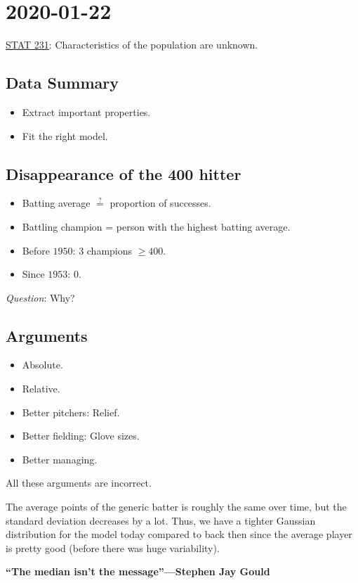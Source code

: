 \section{2020-01-22}
\underline{STAT 231}: Characteristics of the population
are unknown.

\subsection*{Data Summary}
\begin{itemize}
    \item Extract important properties.
    \item Fit the right model.
\end{itemize}

\subsection*{Disappearance of the 400 hitter}
\begin{itemize}
    \item Batting average $ \stackrel{?}{=} $ proportion of successes.
    \item Battling champion = person with the highest batting average.
    \item Before $ 1950 $: 3 champions $ \geqslant 400 $.
    \item Since $ 1953 $: 0.
\end{itemize}
\emph{Question}: Why?

\subsection*{Arguments}
\begin{itemize}
    \item Absolute.
    \item Relative.
    \item Better pitchers: Relief.
    \item Better fielding: Glove sizes.
    \item Better managing.
\end{itemize}
All these arguments are incorrect.

The average points of the generic batter is roughly the same over time,
but the standard deviation decreases by a lot. Thus, we have a tighter Gaussian
distribution for the model today compared to back then since the average
player is pretty good (before there was huge variability).

\textbf{``The median isn't the message''---Stephen Jay Gould}
